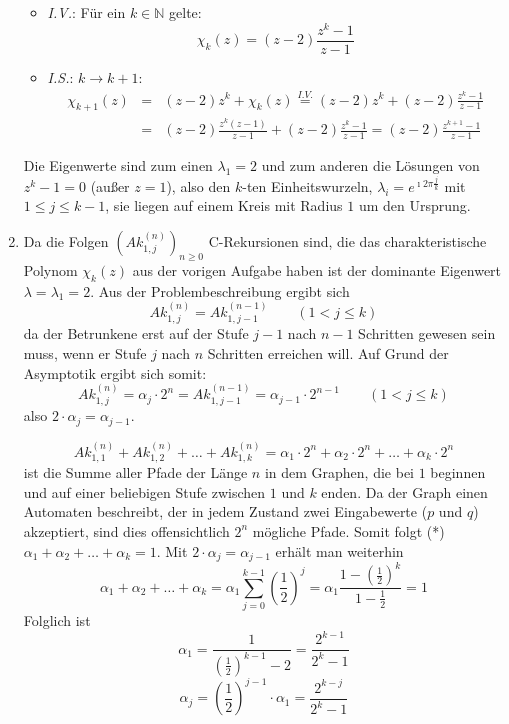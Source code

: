 \begin{enumerate}
\begin{itemize}
		\item \textit{I.V.}: Für ein $k \in \mathbb{N}$ gelte:
			\[ \chi_k(z) = (z-2)\frac{z^k - 1}{z-1} \]
		\item \textit{I.S.}: $k \rightarrow k+1$:
			\begin{eqnarray*}
			\chi_{k+1}(z) &=& (z-2) z^{k} + \chi_k(z) \overset{I.V.}{=} (z-2) z^k + (z-2) \frac{z^k - 1}{z-1} \\
			   &=& (z-2) \frac{z^k (z-1)}{z-1} + (z-2)\frac{z^k - 1}{z-1} =
			   (z-2) \frac{z^{k+1} - 1}{z-1}
			\end{eqnarray*}
	\end{itemize}
	Die Eigenwerte sind zum einen $\lambda_1 = 2$ und zum anderen die Lösungen von $z^k - 1 = 0$ (außer $z = 1$), also den
	$k$-ten Einheitswurzeln, $\lambda_i = e^{\imath 2 \pi \frac{j}{k}}$ mit $1 \leq j \leq k-1$, sie liegen
	auf einem Kreis mit Radius $1$ um den Ursprung.

\item 
Da die Folgen $\left( Ak_{1,j}^{(n)} \right)_{n \geq 0}$ C-Rekursionen sind, die das charakteristische Polynom $\chi_k(z)$
aus der vorigen Aufgabe haben ist der dominante Eigenwert $\lambda = \lambda_1 = 2$.
Aus der Problembeschreibung ergibt sich 
\[ Ak_{1,j}^{(n)} = Ak_{1,j-1}^{(n-1)} \quad \quad (1 < j \leq k) \]
da der Betrunkene erst auf der Stufe $j-1$ nach $n-1$ Schritten gewesen sein muss, wenn er Stufe $j$ nach $n$ Schritten erreichen will.
Auf Grund der Asymptotik ergibt sich somit:
\[ Ak_{1,j}^{(n)} = \alpha_j \cdot 2^n = Ak_{1,j-1}^{(n-1)} = \alpha_{j-1} \cdot 2^{n-1} \quad \quad (1 < j \leq k) \]
also $2 \cdot \alpha_j = \alpha_{j-1}$.

\[ Ak_{1,1}^{(n)} + Ak_{1,2}^{(n)} + \ldots + Ak_{1,k}^{(n)} = \alpha_1 \cdot 2^n + \alpha_2 \cdot 2^n + \ldots + \alpha_k \cdot 2^n \]
ist die Summe aller Pfade der Länge $n$ in dem Graphen, die bei $1$ beginnen und auf einer beliebigen Stufe zwischen $1$ und $k$ enden.
Da der Graph einen Automaten beschreibt, der in jedem Zustand zwei Eingabewerte ($p$ und $q$) akzeptiert, sind dies offensichtlich
$2^n$ mögliche Pfade.
Somit folgt (*) $\alpha_1 + \alpha_2 + \ldots + \alpha_k = 1$.
Mit $2 \cdot \alpha_j = \alpha_{j-1} $ erhält man weiterhin 
\[ \alpha_1 + \alpha_2 + \ldots + \alpha_k = \alpha_1 \sum_{j=0}^{k-1} \left( \frac{1}{2}\right)^j 
   = \alpha_1  \frac{1 - \left(\frac{1}{2}\right)^k}{1 - \frac{1}{2}}  = 1 \]
Folglich ist 
\[ \alpha_1 = \frac{1}{\left(\frac{1}{2}\right)^{k-1} - 2} = \frac{2^{k-1}}{2^k - 1} \]
\[ \alpha_j = \left(\frac{1}{2}\right)^{j-1} \cdot \alpha_1 = \frac{2^{k-j}}{2^k - 1}\]


\end{enumerate}
